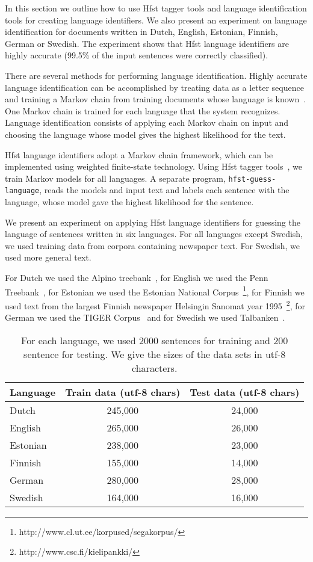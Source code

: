 \documentclass{llncs}
\begin{document}
In this section we outline how to use Hfst tagger tools and language
identification tools for creating language identifiers. We also
present an experiment on language identification for documents written
in Dutch, English, Estonian, Finnish, German or Swedish. The
experiment shows that Hfst language identifiers are highly accurate
(99.5\% of the input sentences were correctly classified).

There are several methods for performing language
identification. Highly accurate language identification can be
accomplished by treating data as a letter sequence and training
a Markov chain from training documents whose language is
known~\cite{cavnar/1994}. One Markov chain is trained for each
language that the system recognizes. Language identification consists
of applying each Markov chain on input and choosing the language whose
model gives the highest likelihood for the text. 

Hfst language identifiers adopt a Markov chain framework, which can be
implemented using weighted finite-state technology. Using Hfst tagger
tools~\cite{silfverberg/2011}, we train Markov models for all
languages. A separate program, {\tt hfst-guess-language}, reads the
models and input text and labels each sentence with the language,
whose model gave the highest likelihood for the sentence.

We present an experiment on applying Hfst language identifiers for
guessing the language of sentences written in six languages. For all
languages except Swedish, we used training data from corpora
containing newspaper text. For Swedish, we used more general text.

For Dutch we used the Alpino treebank~\cite{bouma/2000}, for English
we used the Penn Treebank~\cite{marcus/1993}, for Estonian we used the
Estonian National
Corpus~\footnote{http://www.cl.ut.ee/korpused/segakorpus/}, for
Finnish we used text from the largest Finnish newspaper Helsingin
Sanomat year 1995~\footnote{http://www.csc.fi/kielipankki/}, for
German we used the TIGER Corpus~\cite{brants/2002} and for Swedish we
used Talbanken~\cite{einarsson/1976}.

\begin{table}
\begin{center}
\begin{tabular}{l|cc}
Language & Train data (utf-8 chars) & Test data (utf-8 chars)\\
\hline
Dutch    & 245,000  & 24,000\\
English  & 265,000  & 26,000\\
Estonian & 238,000  & 23,000\\
Finnish  & 155,000  & 14,000\\
German   & 280,000  & 28,000\\
Swedish  & 164,000  & 16,000\\
\end{tabular}
\caption{For each language, we used 2000 sentences for training and
  200 sentence for testing. We give the sizes of the data sets in
  utf-8 characters.}\label{tab:lang-id-data}
\end{center}
\end{table}
\end{document}
